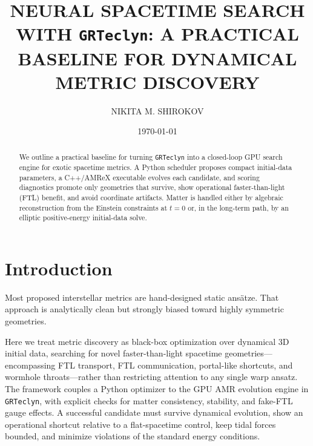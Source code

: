\documentclass[twocolumn,floatfix,aps,prd,nofootinbib]{revtex4-2}
\begin{document}
\title{\texorpdfstring{\MakeTextUppercase{Neural Spacetime Search with \texttt{GRTeclyn}: A Practical Baseline for Dynamical Metric Discovery}}{Neural Spacetime Search with GRTeclyn: A Practical Baseline for Dynamical Metric Discovery}}

\author{\MakeTextUppercase{Nikita M. Shirokov}}
\date{\today}

\begin{abstract}
We outline a practical baseline for turning \texttt{GRTeclyn} into a closed-loop GPU search engine for exotic spacetime metrics. A Python scheduler proposes compact initial-data parameters, a C++/AMReX executable evolves each candidate, and scoring diagnostics promote only geometries that survive, show operational faster-than-light (FTL) benefit, and avoid coordinate artifacts. Matter is handled either by algebraic reconstruction from the Einstein constraints at $t=0$ or, in the long-term path, by an elliptic positive-energy initial-data solve.
\end{abstract}

\maketitle

\section{Introduction}

Most proposed interstellar metrics are hand-designed static ans\"atze.  That approach is analytically clean but strongly biased toward highly symmetric geometries.

Here we treat metric discovery as black-box optimization over dynamical 3D initial data, searching for novel faster-than-light spacetime geometries---encompassing FTL transport, FTL communication, portal-like shortcuts, and wormhole throats---rather than restricting attention to any single warp ansatz.  The framework couples a Python optimizer to the GPU AMR evolution engine in \texttt{GRTeclyn}, with explicit checks for matter consistency, stability, and fake-FTL gauge effects.  A successful candidate must survive dynamical evolution, show an operational shortcut relative to a flat-spacetime control, keep tidal forces bounded, and minimize violations of the standard energy conditions.
\end{document}
